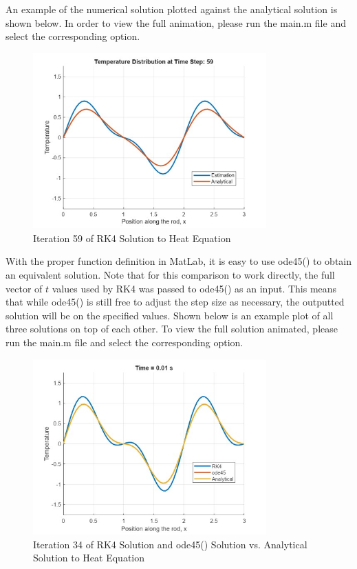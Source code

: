 \documentclass{article}
\begin{document}
An example of the numerical solution plotted against the analytical solution is shown below. In order to view the full animation, please run the main.m file and select the corresponding option.
\begin{figure}[H]
    \centering
    \includegraphics[width=0.8\textwidth]{heat_example.jpg}
    \caption{Iteration 59 of RK4 Solution to Heat Equation}
\end{figure}
With the proper function definition in MatLab, it is easy to use ode45() to obtain an equivalent solution. Note that for this comparison to work directly, the full vector of $t$ values used by RK4 was passed to ode45() as an input. This means that while ode45() is still free to adjust the step size as necessary, the outputted solution will be on the specified values. Shown below is an example plot of all three solutions on top of each other. To view the full solution animated, please run the main.m file and select the corresponding option.
\begin{figure}[H]
    \centering
    \includegraphics[width=0.8\textwidth]{heat_all_example.jpg}
    \caption{Iteration 34 of RK4 Solution and ode45() Solution vs. Analytical Solution to Heat Equation}
\end{figure}
\end{document}

